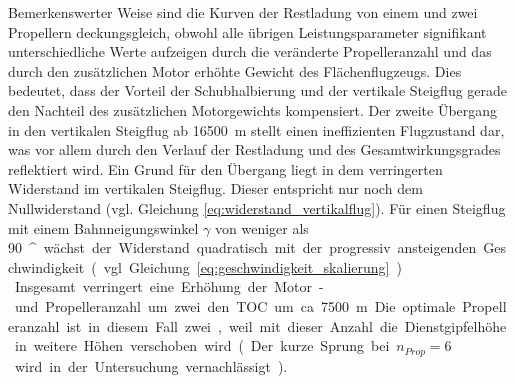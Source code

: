 Bemerkenswerter Weise sind die Kurven der Restladung von einem und zwei Propellern deckungsgleich, obwohl alle übrigen Leistungsparameter signifikant unterschiedliche Werte aufzeigen durch die veränderte Propelleranzahl und das durch den zusätzlichen Motor erhöhte Gewicht des Flächenflugzeugs. Dies bedeutet, dass der Vorteil der Schubhalbierung und der vertikale Steigflug gerade den Nachteil des zusätzlichen Motorgewichts kompensiert. Der zweite Übergang in den vertikalen Steigflug ab \SI{16500}{m} stellt einen ineffizienten Flugzustand dar, was vor allem durch den Verlauf der Restladung und des Gesamtwirkungsgrades reflektiert wird. Ein Grund für den Übergang liegt in dem verringerten Widerstand im vertikalen Steigflug. Dieser entspricht nur noch dem Nullwiderstand (vgl. Gleichung \eqref{eq:widerstand_vertikalflug}). Für einen Steigflug mit einem Bahnneigungswinkel \ensuremath{\gamma} von weniger als \SI{90}{^\circ} wächst der Widerstand quadratisch mit der progressiv ansteigenden Geschwindigkeit (vgl. Gleichung \eqref{eq:geschwindigkeit_skalierung}).\\
Insgesamt verringert eine Erhöhung der Motor- und Propelleranzahl um zwei den TOC um ca. \SI{7500}{m}. Die optimale Propelleranzahl ist in diesem Fall zwei, weil mit dieser Anzahl die Dienstgipfelhöhe in weitere Höhen verschoben wird.
(Der kurze Sprung bei \ensuremath{n_{Prop} = 6} wird in der Untersuchung vernachlässigt).

